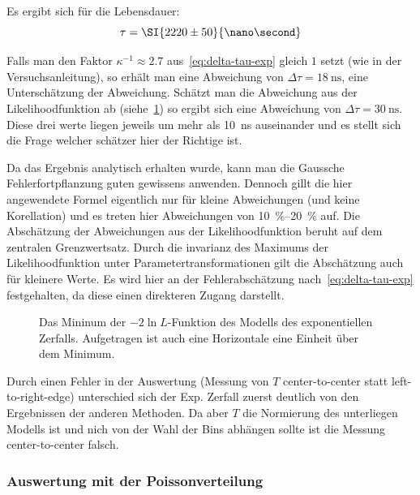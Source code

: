 \documentclass[slug=LM, room=Andreas-Schubert-Bau\,\ K\ 1A, supervisor=Anne-Sophie\ Berthold, coursedate=13.\ 12.\ 2019]{../../Lab_Report_LaTeX/lab_report}
\begin{document}
Es ergibt sich f\"ur die Lebensdauer:
\begin{equation}
  \label{eq:result-exponential}
  \tau = \SI{2220\pm 50}{\nano\second}
\end{equation}

Falls man den Faktor \(\kappa^{-1} \approx 2.7\)
aus~\ref{eq:delta-tau-exp} gleich \(1\) setzt (wie in der
Versuchsanleitung), so erh\"alt man eine Abweichung von
\(\Delta\tau = \SI{18}{\nano\second}\), eine Untersch\"atzung der
Abweichung. Sch\"atzt man die Abweichung aus der Likelihoodfunktion ab
(siehe~\ref{fig:haupt-exp}) so ergibt sich eine Abweichung von
\(\Delta\tau = \SI{30}{\nano\second}\). Diese drei werte liegen
jeweils um mehr als \SI{10}{\nano\second} auseinander und es stellt
sich die Frage welcher sch\"atzer hier der Richtige ist.

Da das Ergebnis analytisch erhalten wurde, kann man die Gaussche
Fehlerfortpflanzung guten gewissens anwenden. Dennoch gillt die hier
angewendete Formel eigentlich nur f\"ur kleine Abweichungen (und keine
Korellation) und es treten hier Abweichungen von
\SIrange{10}{20}{\percent} auf. Die Absch\"atzung der Abweichungen aus
der Likelihoodfunktion beruht auf dem zentralen Grenzwertsatz. Durch
die invarianz des Maximums der Likelihoodfunktion unter
Parametertransformationen gilt die Absch\"atzung auch f\"ur kleinere
Werte. Es wird hier an der Fehlerabsch\"atzung
nach~\ref{eq:delta-tau-exp} festgehalten, da diese einen direkteren
Zugang darstellt.


\begin{figure}[h]\centering
  
  \caption{Das Mininum der \(-2\ln{L}\)-Funktion des Modells des
    exponentiellen Zerfalls. Aufgetragen ist auch eine Horizontale
    eine Einheit \"uber dem Minimum.}
  \label{fig:haupt-exp}
\end{figure}

\begin{itshape}
  Durch einen Fehler in der Auswertung (Messung von \(T\)
  center-to-center statt left-to-right-edge) unterschied sich der
  Exp. Zerfall zuerst deutlich von den Ergebnissen der anderen
  Methoden. Da aber \(T\) die Normierung des unterliegen Modells ist
  und nich von der Wahl der Bins abh\"angen sollte ist die Messung
  center-to-center falsch.
\end{itshape}


\subsubsection{Auswertung mit der Poissonverteilung}
\label{sec:auw-poisson}
\end{document}
